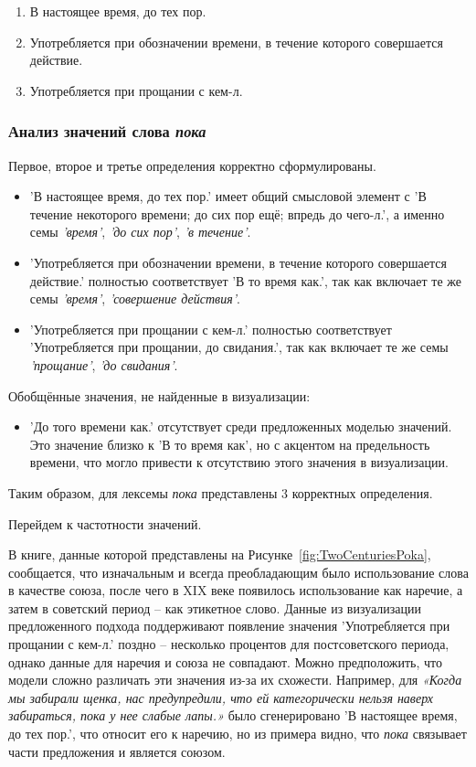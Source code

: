 \documentclass[LI,VKR]{HSEUniversity}
\begin{document}
\begin{enumerate}
    \item В настоящее время, до тех пор.
    \item Употребляется при обозначении времени, в течение которого совершается действие.
    \item Употребляется при прощании с кем-л.
\end{enumerate}

\subsubsection*{Анализ значений слова \textit{пока}}

Первое, второе и третье определения корректно сформулированы.

\begin{itemize}
    \item ’В настоящее время, до тех пор.’ имеет общий смысловой элемент с
’В течение некоторого времени; до сих пор ещё; впредь до чего-л.’,
а именно семы \textit{’время’}, \textit{’до сих пор’}, \textit{’в течение’}.

    \item ’Употребляется при обозначении времени, в течение которого совершается действие.’ полностью соответствует
’В то время как.’, так как включает те же семы \textit{’время’}, \textit{’совершение действия’}.

    \item ’Употребляется при прощании с кем-л.’ полностью соответствует
’Употребляется при прощании, до свидания.’, так как включает те же семы \textit{’прощание’}, \textit{’до свидания’}.
\end{itemize}

Обобщённые значения, не найденные в визуализации:
\begin{itemize}
    \item ’До того времени как.’ отсутствует среди предложенных моделью значений.
Это значение близко к ’В то время как’, но с акцентом на предельность времени,
что могло привести к отсутствию этого значения в визуализации.
\end{itemize}

Таким образом, для лексемы \textit{пока} представлены 3 корректных определения.

Перейдем к частотности значений.

В книге, данные которой представлены на Рисунке~\ref{fig:TwoCenturiesPoka}, сообщается,
что изначальным и всегда преобладающим было использование слова в качестве
союза, после чего в XIX веке появилось использование как наречие, а затем в советский период
– как этикетное слово.
Данные из визуализации предложенного подхода поддерживают появление значения
’Употребляется при прощании с кем-л.’
поздно – несколько процентов для постсоветского периода, однако данные для наречия и союза
не совпадают.
Можно предположить, что модели сложно различать эти значения из-за их схожести.
Например, для
\textit{«Когда мы забирали щенка, нас предупредили, что ей категорически нельзя наверх забираться,
пока у нее слабые лапы.»}
было сгенерировано ’В настоящее время, до тех пор.’,
что относит его к наречию,
но из примера видно, что \textit{пока} связывает части предложения и является союзом.
\end{document}
